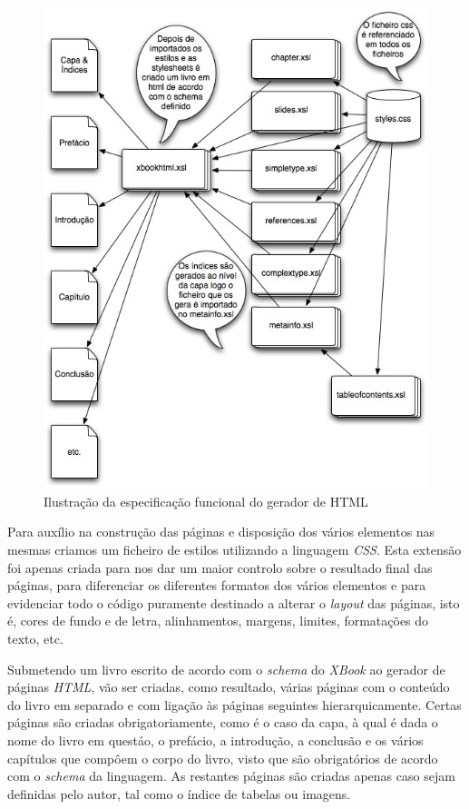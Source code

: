 \documentclass[a4paper]{article}
\begin{document}
\begin{figure}[!ht]
\begin{center}
\includegraphics[width=1\textwidth]{./Images/funcspec.jpg}
\caption{Ilustração da especificação funcional do gerador de HTML}
\end{center}
\end{figure}

\hspace{1cm}Para auxílio na construção das páginas e disposição dos vários elementos nas mesmas criamos um ficheiro de estilos utilizando a linguagem \emph{CSS}. Esta extensão foi apenas criada para nos dar um maior controlo sobre o resultado final das páginas, para diferenciar os diferentes formatos dos vários elementos e para evidenciar todo o código puramente destinado a alterar o \emph{layout} das páginas, isto é, cores de fundo e de letra, alinhamentos, margens, limites, formatações do texto, etc.

\hspace{1cm}Submetendo um livro escrito de acordo com o \emph{schema} do \emph{XBook} ao gerador de páginas \emph{HTML}, vão ser criadas, como resultado, várias
páginas com o conteúdo do livro em separado e com ligação às páginas seguintes hierarquicamente. Certas páginas são criadas obrigatoriamente, como é o caso da capa, à qual é dada o nome do livro em questáo, o prefácio, a introdução, a conclusão e os vários capítulos que compôem o corpo do livro, visto que são obrigatórios de acordo com o \emph{schema} da linguagem. As restantes páginas são criadas apenas caso sejam definidas pelo autor, tal como o índice de tabelas ou imagens.\\
\end{document}
